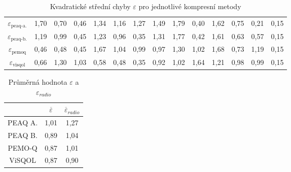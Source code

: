 \tabulinesep=1.3mm
\begin{table}[h]
\centering
\small
\begin{tabu}{|c|c|c|c|c|c|c|c|c|c|c|c|c|c|}
\hline
 &  &  &  &  &  &  &  &  &  &  &  &  &  \\ \hline
$\varepsilon_{\text{peaq-a.}}$ & 1,70 & 0,70 & 0,46 & 1,34 & 1,16 & 1,27 & 1,49 & 1,79 & 0,40 & 1,62 & 0,75 & 0,21 & 0,15 \\ \hline
$\varepsilon_{\text{peaq-b.}}$ & 1,19 & 0,99 & 0,45 & 1,23 & 0,96 & 0,35 & 1,31 & 1,77 & 0,42 & 1,61 & 0,63 & 0,57 & 0,15 \\ \hline
$\varepsilon_{\text{pemoq}}$ & 0,46 & 0,48 & 0,45 & 1,67 & 1,04 & 0,99 & 0,97 & 1,30 & 1,02 & 1,68 & 0,73 & 1,19 & 0,15 \\ \hline
$\varepsilon_{\text{visqol}}$ & 0,66 & 1,30 & 1,03 & 0,58 & 0,48 & 0,35 & 0,92 & 1,02 & 1,64 & 1,21 & 0,98 & 0,99 & 0,15 \\ \hline
\end{tabu}
\caption{Kvadratické střední chyby $\varepsilon$ pro jednotlivé kompresní metody}
\label{table:epsilon}
\end{table}

\begin{table}[h]
\centering
\begin{tabu}{|c|c|c|}
\hline
 & $\overline{\varepsilon}$ & $\overline{\varepsilon}_{radio}$ \\ \hline
PEAQ A. & 1,01 & 1,27 \\ \hline
PEAQ B. & 0,89 & 1,04 \\ \hline
PEMO-Q & 0,87 & 1,01 \\ \hline
ViSQOL & 0,87 & 0,90 \\ \hline
\end{tabu}
\caption{Průměrná hodnota $\varepsilon$ a $\varepsilon_{radio}$}
\label{table:epsilon:avg}
\end{table}

